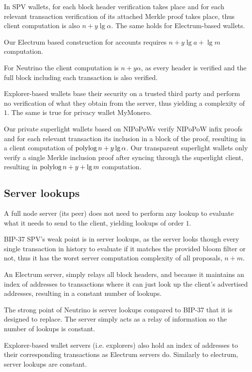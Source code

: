 In SPV wallets, for each block header verification takes place and for each relevant transaction verification of its attached Merkle proof takes place, thus client computation is also $n+y\lg{\alpha}$. The same holds for Electrum-based wallets.

Our Electrum based construction for accounts requires $n+y\lg{a}+\lg{m}$ computation.

For Neutrino the client computation is $n+y\alpha$, as every header is verified and the full block including each transaction is also verified.

Explorer-based wallets base their security on a trusted third party and perform no verification of what they obtain from the server, thus yielding a complexity of $1$. The same is true for privacy wallet MyMonero.

Our private superlight wallets based on NIPoPoWs verify NIPoPoW infix proofs and for each relevant transaction its inclusion in a block of the proof, resulting in a client computation of $\operatorname{polylog}{n} + y\lg{\alpha}$. Our transparent superlight wallets only verify a single Merkle inclusion proof after syncing through the superlight client, resulting in $\operatorname{polylog}{n} + y + \lg{m}$ computation.

\subsection{Server lookups}

A full node server (its peer) does not need to perform any lookup to evaluate what it needs to send to the client, yielding lookups of order $1$.

BIP-37 SPV's weak point is in server lookups, as the server looks though every single transaction in history to evaluate if it matches the provided bloom filter or not, thus it has the worst server computation complexity of all proposals, $n+m$.

An Electrum server, simply relays all block headers, and because it maintains an index of addresses to transactions where it can just look up the client's advertised addresses, resulting in a constant number of lookups.

The strong point of Neutrino is server lookups compared to BIP-37 that it is designed to replace. The server simply acts as a relay of information so the number of lookups is constant.

Explorer-based wallet servers (i.e. explorers) also hold an index of addresses to their corresponding transactions as Electrum servers do. Similarly to electrum, server lookups are constant.

